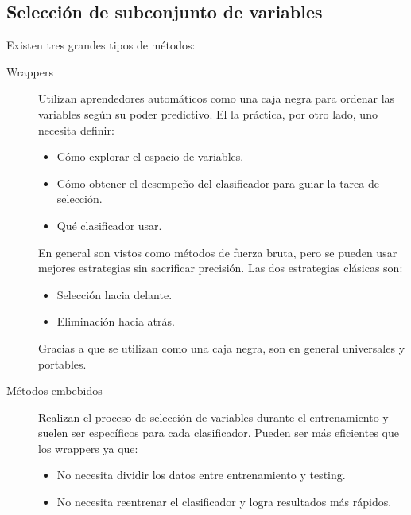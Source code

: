 \documentclass[11pt,spanish]{article}
\begin{document}
\subsection{Selección de subconjunto de variables}
Existen tres grandes tipos de métodos:
\begin{description}
    \item[Wrappers] Utilizan aprendedores automáticos como una caja negra para
    ordenar las variables según su poder predictivo. El la práctica, por otro
    lado, uno necesita definir:
    \begin{itemize}
        \item Cómo explorar el espacio de variables.
        \item Cómo obtener el desempeño del clasificador para guiar la tarea de
        selección.
        \item Qué clasificador usar.
    \end{itemize}
    En general son vistos como métodos de fuerza bruta, pero se pueden usar
    mejores estrategias sin sacrificar precisión. Las dos estrategias clásicas
    son:
    \begin{itemize}
        \item Selección hacia delante.
        \item Eliminación hacia atrás.
    \end{itemize}
    Gracias a que se utilizan como una caja negra, son en general universales
    y portables.

    \item[Métodos embebidos] Realizan el proceso de selección de variables
    durante el entrenamiento y suelen ser específicos para cada clasificador.
    Pueden ser más eficientes que los wrappers ya que:
    \begin{itemize}
        \item No necesita dividir los datos entre entrenamiento y testing.
        \item No necesita reentrenar el clasificador y logra resultados más
        rápidos.
    \end{itemize}


\end{description}
\end{document}
